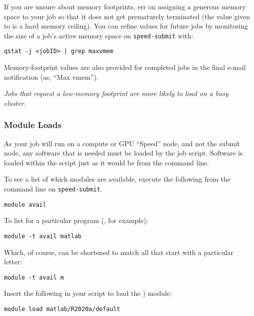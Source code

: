 \documentclass{easychair}
\begin{document}
If you are unsure about memory footprints, err on assigning a generous
memory space to your job so that it does not get prematurely terminated
(the value given to  is a hard memory ceiling). You can refine
 values for future jobs by monitoring the size of a job's active
memory space on \texttt{speed-submit} with:

\begin{verbatim}
qstat -j <jobID> | grep maxvmem
\end{verbatim}

Memory-footprint values are also provided for completed jobs in the final
e-mail notification (as, ``Max vmem'').

\emph{Jobs that request a low-memory footprint are more likely to load on a busy
cluster.}

\subsubsection{Module Loads}

As your job will run on a compute or GPU ``Speed'' node, and not the submit node,
any software that is needed must be loaded by the job script. Software is loaded
within the script just as it would be from the command line.

To see a list of which modules are available, execute the following from the 
command line on \texttt{speed-submit}.

\begin{verbatim}
module avail
\end{verbatim}

To list for a particular program (, for example):

\begin{verbatim}
module -t avail matlab
\end{verbatim}

Which, of course, can be shortened to match all that start with a
particular letter:

\begin{verbatim}
module -t avail m
\end{verbatim}

Insert the following in your script to load the ) module:

\begin{verbatim}
module load matlab/R2020a/default
\end{verbatim}
\end{document}
